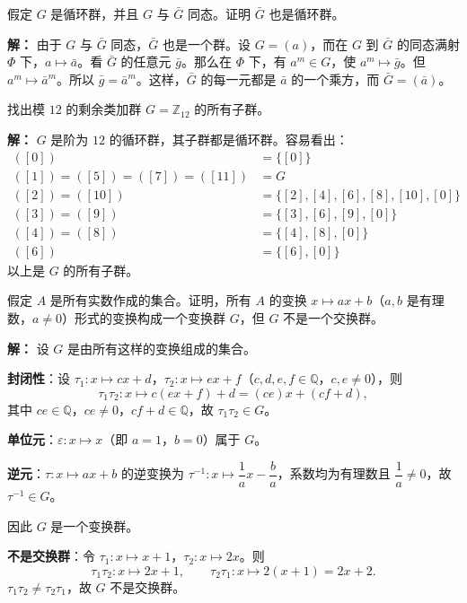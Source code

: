 \begin{example}[循环群的同态像也是循环群]
假定 $G$ 是循环群，并且 $G$ 与 $\bar{G}$ 同态。证明 $\bar{G}$ 也是循环群。

\textbf{解：} 由于 $G$ 与 $\bar{G}$ 同态，$\bar{G}$ 也是一个群。设 $G=(a)$，而在 $G$ 到 $\bar{G}$ 的同态满射 $\Phi$ 下，$a\longmapsto\bar{a}$。看 $\bar{G}$ 的任意元 $\bar{g}$。那么在 $\Phi$ 下，有 $a^m\in G$，使 $a^m\longmapsto\bar{g}$。但 $a^m\longmapsto\bar{a}^m$。所以 $\bar{g}=\bar{a}^m$。这样，$\bar{G}$ 的每一元都是 $\bar{a}$ 的一个乘方，而 $\bar{G}=(\bar{a})$。
\end{example}

\begin{example}[模 $12$ 的剩余类加群的所有子群]
找出模 $12$ 的剩余类加群 $G=\mathbb{Z}_{12}$ 的所有子群。

\textbf{解：} $G$ 是阶为 $12$ 的循环群，其子群都是循环群。容易看出：
\begin{align*}
([0])&=\{[0]\}\\
([1])=([5])=([7])=([11])&=G\\
([2])=([10])&=\{[2],[4],[6],[8],[10],[0]\}\\
([3])=([9])&=\{[3],[6],[9],[0]\}\\
([4])=([8])&=\{[4],[8],[0]\}\\
([6])&=\{[6],[0]\}
\end{align*}
以上是 $G$ 的所有子群。
\end{example}

\begin{example}[有理系数仿射变换群不是交换群]
假定 $A$ 是所有实数作成的集合。证明，所有 $A$ 的变换 $x\mapsto ax+b$（$a,b$ 是有理数，$a\ne0$）形式的变换构成一个变换群 $G$，但 $G$ 不是一个交换群。

\textbf{解：} 设 $G$ 是由所有这样的变换组成的集合。

\textbf{封闭性}：设 $\tau_1:x\mapsto cx+d$，$\tau_2:x\mapsto ex+f$（$c,d,e,f\in\mathbb{Q}$，$c,e\ne0$），则
\[
\tau_1\tau_2: x\mapsto c(ex+f)+d=(ce)x+(cf+d),
\]
其中 $ce\in\mathbb{Q}$，$ce\ne0$，$cf+d\in\mathbb{Q}$，故 $\tau_1\tau_2\in G$。

\textbf{单位元}：$\varepsilon:x\mapsto x$（即 $a=1$，$b=0$）属于 $G$。

\textbf{逆元}：$\tau:x\mapsto ax+b$ 的逆变换为 $\tau^{-1}:x\mapsto\dfrac{1}{a}x-\dfrac{b}{a}$，系数均为有理数且 $\dfrac{1}{a}\ne0$，故 $\tau^{-1}\in G$。

因此 $G$ 是一个变换群。

\textbf{不是交换群}：令 $\tau_1:x\mapsto x+1$，$\tau_2:x\mapsto 2x$。则
\[
\tau_1\tau_2: x\mapsto 2x+1,\qquad \tau_2\tau_1: x\mapsto 2(x+1)=2x+2.
\]
$\tau_1\tau_2\ne\tau_2\tau_1$，故 $G$ 不是交换群。
\end{example}

